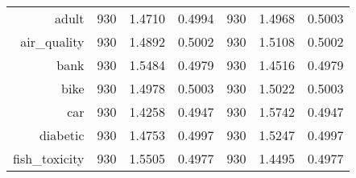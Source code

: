 \begin{table}[htbp]
{\begin{tabular}{rcccccc}
                  adult                              & 930                                        & \cellcolor[rgb]{ .776,  .937,  .808}\textcolor[rgb]{ 0,  .38,  0}{1.4710}          & 0.4994          & 930                               & 1.4968                                                                    & 0.5003          \\
                  air\_quality                       & 930                                        & \cellcolor[rgb]{ .776,  .937,  .808}\textcolor[rgb]{ 0,  .38,  0}{1.4892}          & 0.5002          & 930                               & 1.5108                                                                    & 0.5002          \\
                  bank                               & 930                                        & 1.5484                                                                             & 0.4979          & 930                               & \cellcolor[rgb]{ .776,  .937,  .808}\textcolor[rgb]{ 0,  .38,  0}{1.4516} & 0.4979          \\
                  bike                               & 930                                        & \cellcolor[rgb]{ .776,  .937,  .808}\textcolor[rgb]{ 0,  .38,  0}{1.4978}          & 0.5003          & 930                               & 1.5022                                                                    & 0.5003          \\
                  car                                & 930                                        & \cellcolor[rgb]{ .776,  .937,  .808}\textcolor[rgb]{ 0,  .38,  0}{1.4258}          & 0.4947          & 930                               & 1.5742                                                                    & 0.4947          \\
                  diabetic                           & 930                                        & \cellcolor[rgb]{ .776,  .937,  .808}\textcolor[rgb]{ 0,  .38,  0}{1.4753}          & 0.4997          & 930                               & 1.5247                                                                    & 0.4997          \\
                  fish\_toxicity                     & 930                                        & 1.5505                                                                             & 0.4977          & 930                               & \cellcolor[rgb]{ .776,  .937,  .808}\textcolor[rgb]{ 0,  .38,  0}{1.4495} & 0.4977          \\

\end{tabular}}
\end{table}
